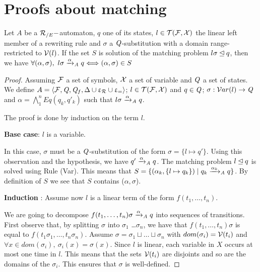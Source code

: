 \section{Proofs about matching}
\begin{theorem}
  \label{thm:matching-complete}
  Let $A$ be a ${\mathcal R_{/E}}-$automaton, $q$ one of its states, $l \in \mathcal{T(F, X)}$ the
  linear left member of a rewriting rule and $\sigma$ a $\mathit Q$-substitution with 
  a domain range-restricted to $\mathcal V(l)$. If the set $S$ is solution of the matching problem
  $l\sigma \unlhd q$, then we have $\forall (\alpha, \sigma),\ l\sigma \xrightarrow{\alpha}_\mathit A q \Longleftrightarrow (\alpha, \sigma) \in S$
\end{theorem}

\begin{proof}
  Assuming $\mathcal{F}$ a set of symbols, $\mathcal X$ a set of variable and
  $\mathit Q$ a set of states. We define $A = \langle \mathcal{F}, \mathit Q, \mathit Q_f, \Delta \cup \upvarepsilon_{\mathcal R} \cup \upvarepsilon_{=}\rangle$;
  $l \in \mathcal{T(F, X)}$ and $q \in \mathit Q$; $\sigma : \mathcal{ V}ar(l) \rightarrow \mathit Q$ and $\alpha = \bigwedge_1^n Eq(q_k,q'_k)$ such that $l\sigma \xrightarrow{\alpha}_\mathit A q$.

  \medskip
  \noindent
  The proof is done by induction on the term $l$.

  \medskip
  \noindent
  {\bf Base case}: $l$ is a variable.

  In this case, $\sigma$ must be a $\mathit Q$-substitution of the form $\sigma =\{ l \mapsto q' \}$.
  Using this observation and the hypothesis, we have $q' \xrightarrow{\alpha}_\mathit A q$.
  The matching problem $l \unlhd q$ is solved using Rule (Var).
  This means that $S = \{(\alpha_k, \{l \mapsto q_k\}) \; | \; q_k \xrightarrow{\alpha_k}_\mathit A q\}$.
  By definition of $S$ we see that $S$ contains ($\alpha, \sigma$).

  \medskip
  \noindent
  {\bf Induction} :
  Assume now $l$ is a linear term of the form $f(t_1,\dots, t_n)$.

  We are going to decompose $f(t_1,\dots, t_n)\sigma \xrightarrow{\alpha}_\mathit A q$ into sequences of transitions.
  First observe that, by splitting $\sigma$ into $\sigma_1$ \dots $\sigma_n$, we have that $f(t_1,\dots, t_n)\sigma$ 
  is equal to $f(t_1\sigma_1, \dots,t_n\sigma_n)$.
  Assume $\sigma = \sigma_1 \sqcup \dots \sqcup \sigma_n$ with $dom(\sigma_i) = \mathcal V(t_i)$ 
  and $\forall x \in dom(\sigma_i),\ \sigma_i(x) = \sigma(x)$.
  Since $l$ is linear, each variable in $X$ occurs at most one time in $l$.
  This means that the sets $\mathcal V(t_i)$ are disjoints and so are the domains of the $\sigma_i$.
  This ensures that $\sigma$ is well-defined.



\end{proof}
